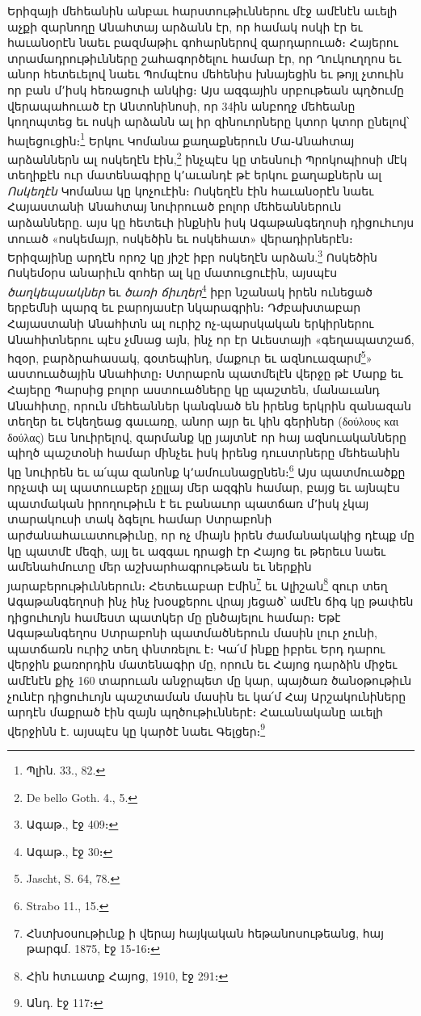 \documentclass{article}
\begin{document}
{Երիզայի մեհեանին անբաւ հարստութիւններու մէջ ամէնէն աւելի աչքի զարնողը Անահտայ արձանն էր, որ համակ ոսկի էր եւ հաւանօրէն նաեւ բազմաթիւ գոհարներով զարդարուած։ Հայերու տրամադրութիւնները շահագործելու համար էր, որ Ղուկուղղոս եւ անոր հետեւելով նաեւ Պոմպէոս մեհենիս խնայեցին եւ թոյլ չտուին որ բան մ՚իսկ հեռացուի անկից։ Այս ազգային սրբութեան պղծումը վերապահուած էր Անտոնինոսի, որ 34ին անբողջ մեհեանը կողոպտեց եւ ոսկի արձանն ալ իր զինուորները կտոր կտոր ընելով՝ հալեցուցին։\footnote{Պլին. 33., 82.} Երկու Կոմանա քաղաքներուն Մա֊Անահտայ արձաններն ալ ոսկեղէն էին,\footnote{De bello Goth. 4., 5.} ինչպէս կը տեսնուի Պրոկոպիոսի մէկ տեղիքէն ուր մատենագիրը կ՚աւանդէ թէ երկու քաղաքներն ալ \emph{Ոսկեղէն} Կոմանա կը կոչուէին։ Ոսկեղէն էին հաւանօրէն նաեւ Հայաստանի Անահտայ նուիրուած բոլոր մեհեաններուն արձանները. այս կը հետեւի ինքնին իսկ Ագաթանգեղոսի դիցուհւոյս տուած «ոսկեմայր, ոսկեծին եւ ոսկեհատ» վերադիրներէն։ Երիզայինը արդէն որոշ կը յիշէ իբր ոսկեղէն արձան.\footnote{Ագաթ., էջ 409։} Ոսկեծին Ոսկեմօրս անարիւն զոհեր ալ կը մատուցուէին, այսպէս \emph{ծաղկեպսակներ} եւ \emph{ծառի ճիւղեր}\footnote{Ագաթ., էջ 30։} իբր նշանակ իրեն ունեցած երբեմնի պարզ եւ բարոյասէր նկարագրին։ Դժբախտաբար Հայաստանի Անահիտն ալ ուրիշ ոչ֊պարսկական երկիրներու Անահիտներու պէս չմնաց այն, ինչ որ էր Աւեստայի «գեղապատշաճ, հզօր, բարձրահասակ, գօտեպինդ, մաքուր եւ ազնուազարմ\footnote{Jascht, S. 64, 78.}» աստուածային Անահիտը։ Ստրաբոն պատմելէն վերջը թէ Մարք եւ Հայերը Պարսից բոլոր աստուածները կը պաշտեն, մանաւանդ Անահիտը, որուն մեհեաններ կանգնած են իրենց երկրին զանազան տեղեր եւ Եկեղեաց գաւառը, անոր այր եւ կին գերիներ (δούλους και δούλας) եւս նուիրելով, զարմանք կը յայտնէ որ հայ ազնուականները պիղծ պաշտօնի համար մինչեւ իսկ իրենց դուստրները մեհեանին կը նուիրեն եւ ա՛պա զանոնք կ՚ամուսնացընեն։\footnote{Strabo 11., 15.} Այս պատմուածքը որչափ ալ պատուաբեր չըլլայ մեր ազգին համար, բայց եւ այնպէս պատմական իրողութիւն է եւ բանաւոր պատճառ մ՚իսկ չկայ տարակուսի տակ ձգելու համար Ստրաբոնի արժանահաւատութիւնը, որ ոչ միայն իրեն ժամանակակից դէպք մը կը պատմէ մեզի, այլ եւ ազգաւ դրացի էր Հայոց եւ թերեւս նաեւ ամենահմուտը մեր աշխարհագրութեան եւ ներքին յարաբերութիւններուն։ Հետեւաբար Էմին\footnote{Հնտխօսութիւնք ի վերայ հայկական հեթանոսութեանց, հայ թարգմ. 1875, էջ 15֊16։} եւ Ալիշան\footnote{Հին հտւատք Հայոց, 1910, էջ 291։} զուր տեղ Ագաթանգեղոսի ինչ ինչ խօսքերու վրայ յեցած՝ ամէն ճիգ կը թափեն դիցուհւոյն համեստ պատկեր մը ընծայելու համար։ Եթէ Ագաթանգեղոս Ստրաբոնի պատմածներուն մասին լուր չունի, պատճառն ուրիշ տեղ փնտռելու է։ Կա՛մ ինքը իբրեւ Երդ դարու վերջին քառորդին մատենագիր մը, որուն եւ Հայոց դարձին միջեւ ամէնէն քիչ 160 տարուան անջրպետ մը կար, պայծառ ծանօթութիւն չունէր դիցուհւոյն պաշտաման մասին եւ կա՛մ Հայ Արշակունիները արդէն մաքրած էին զայն պղծութիւններէ։ Հաւանականը աւելի վերջինն է. այսպէս կը կարծէ նաեւ Գելցեր։\footnote{Անդ. էջ 117։}

}
\end{document}
